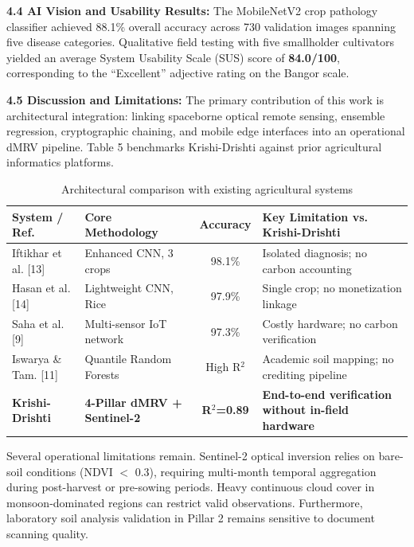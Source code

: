 \documentclass[11pt,a4paper]{article}
\begin{document}
\noindent \textbf{4.4 AI Vision and Usability Results:} 
The MobileNetV2 crop pathology classifier achieved 88.1\% overall accuracy across 730 validation images spanning five disease categories. Qualitative field testing with five smallholder cultivators yielded an average System Usability Scale (SUS) score of \textbf{84.0/100}, corresponding to the ``Excellent'' adjective rating on the Bangor scale.

\noindent \textbf{4.5 Discussion and Limitations:} 
The primary contribution of this work is architectural integration: linking spaceborne optical remote sensing, ensemble regression, cryptographic chaining, and mobile edge interfaces into an operational dMRV pipeline. Table 5 benchmarks Krishi-Drishti against prior agricultural informatics platforms.

\begin{table}[H]
\caption{Architectural comparison with existing agricultural systems}
\centering
\begin{tabularx}{\textwidth}{l p{3.0cm} c X}
\toprule
\textbf{System / Ref.} & \textbf{Core Methodology} & \textbf{Accuracy} & \textbf{Key Limitation vs. Krishi-Drishti} \\
\midrule
Iftikhar et al. [13] & Enhanced CNN, 3 crops & 98.1\% & Isolated diagnosis; no carbon accounting \\
Hasan et al. [14] & Lightweight CNN, Rice & 97.9\% & Single crop; no monetization linkage \\
Saha et al. [9] & Multi-sensor IoT network & 97.3\% & Costly hardware; no carbon verification \\
Iswarya \& Tam. [11] & Quantile Random Forests & High R$^2$ & Academic soil mapping; no crediting pipeline \\
\midrule
\textbf{Krishi-Drishti} & \textbf{4-Pillar dMRV + Sentinel-2} & \textbf{R$^2$=0.89} & \textbf{End-to-end verification without in-field hardware} \\
\bottomrule
\end{tabularx}
\end{table}

Several operational limitations remain. Sentinel-2 optical inversion relies on bare-soil conditions (NDVI $<$ 0.3), requiring multi-month temporal aggregation during post-harvest or pre-sowing periods. Heavy continuous cloud cover in monsoon-dominated regions can restrict valid observations. Furthermore, laboratory soil analysis validation in Pillar 2 remains sensitive to document scanning quality.
\vspace{1.2em}
\end{document}
